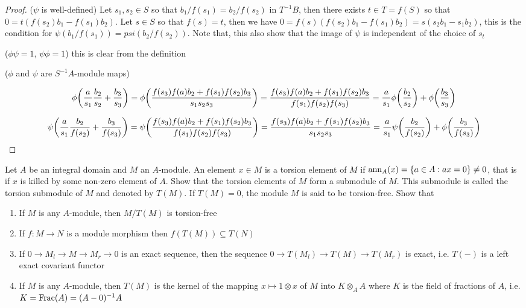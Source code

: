 \begin{proof}
	($\psi$ is well-defined) Let $s_1, s_2 \in S$ so that $b_1 / f(s_1) = b_2 / f(s_2)$ in $T^{-1} B$, then there exists $t \in T = f(S)$ so that $0 = t(f(s_2) b_1 - f(s_1) b_2)$. Let $s \in S$ so that $f(s) = t$, then we have $0 = f(s)(f(s_2) b_1 - f(s_1) b_2) = s(s_2 b_1 - s_1 b_2)$, this is the condition for $\psi(b_1 / f(s_1)) = psi(b_2 / f(s_2))$. Note that, this also show that the image of $\psi$ is independent of the choice of $s_t$

	($\phi \psi = 1$, $\psi \phi = 1$) this is clear from the definition

	($\phi$ and $\psi$ are  $S^{-1} A$-module maps) 
	
	$$
		\phi\tuple*{\frac{a}{s_1} \frac{b_2}{s_2} + \frac{b_3}{s_3}}
		= \phi \tuple*{\frac{f(s_3) f(a) b_2 + f(s_1) f(s_2) b_3}{s_1 s_2 s_3}}
		= \frac{f(s_3) f(a) b_2 + f(s_1) f(s_2) b_3}{f(s_1) f(s_2) f(s_3)}
		= \frac{a}{s_1} \phi\tuple*{\frac{b_2}{s_2}} + \phi\tuple*{\frac{b_3}{s_3}}
	$$
	
	$$
		\psi\tuple*{\frac{a}{s_1} \frac{b_2}{f(s_2)} + \frac{b_3}{f(s_3)}}
		= \psi\tuple*{\frac{f(s_3)f(a) b_2 + f(s_1) f(s_2) b_3}{f(s_1) f(s_2) f(s_3)}}
		= \frac{f(s_3)f(a) b_2 + f(s_1) f(s_2) b_3}{s_1 s_2 s_3}
		= \frac{a}{s_1} \psi\tuple*{\frac{b_2}{f(s_2)}} + \phi\tuple*{\frac{b_3}{f(s_3)}}
	$$
\end{proof}

\begin{problem}
	Let $A$ be an integral domain and $M$ an $A$-module. An element $x \in M$ is a torsion element of $M$ if $\operatorname{ann}_A(x) = \{a \in A: ax = 0\} \neq 0$, that is if $x$ is killed by some non-zero element of $A$. Show that the torsion elements of $M$ form a submodule of $M$. This submodule is called the torsion submodule of $M$ and denoted by $T(M)$. If $T(M) = 0$, the module $M$ is said to be torsion-free. Show that
	\begin{enumerate}
		\item If $M$ is any $A$-module, then $M / T(M)$ is torsion-free
		\item If $f: M \to N$ is a module morphism then $f(T(M)) \subseteq T(N)$
		\item If $0 \to M_l \to M \to M_r \to 0$ is an exact sequence, then the sequence $0 \to T(M_l) \to T(M) \to T(M_r)$ is exact, i.e. $T(-)$ is a left exact covariant functor
		\item If $M$ is any $A$-module, then $T(M)$ is the kernel of the mapping $x \mapsto 1 \otimes x$ of $M$ into $K \otimes_A A$ where $K$ is the field of fractions of $A$, i.e. $K = \operatorname{Frac}(A) = (A - 0)^{-1} A$
	\end{enumerate}
\end{problem}

